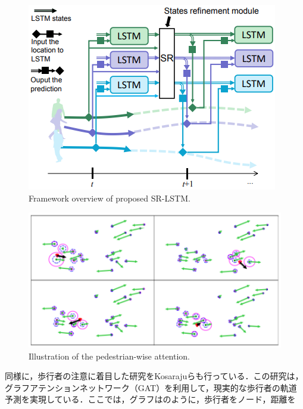 
\begin{figure}[hbtp]
     \centering
    \includegraphics[keepaspectratio, scale=0.65]
         {images/sr-lstm-str.png}
    \caption{Framework overview of proposed SR-LSTM.\protect\footnotemark[2]}
    \label{Fig:sr-lstm-str}
\end{figure}

\begin{figure}[hbtp]
     \centering
    \includegraphics[keepaspectratio, scale=0.65]
         {images/sr-lstm.png}
    \caption{Illustration of the pedestrian-wise attention.\protect\footnotemark[2]}
    \label{Fig:sr-lstm}
\end{figure}

\protect{}

同様に，歩行者の注意に着目した研究をKosarajuらも行っている．この研究は，グラフアテンションネットワーク（GAT）を利用して，現実的な歩行者の軌道予測を実現している．ここでは，グラフはのように，歩行者をノード，距離を

